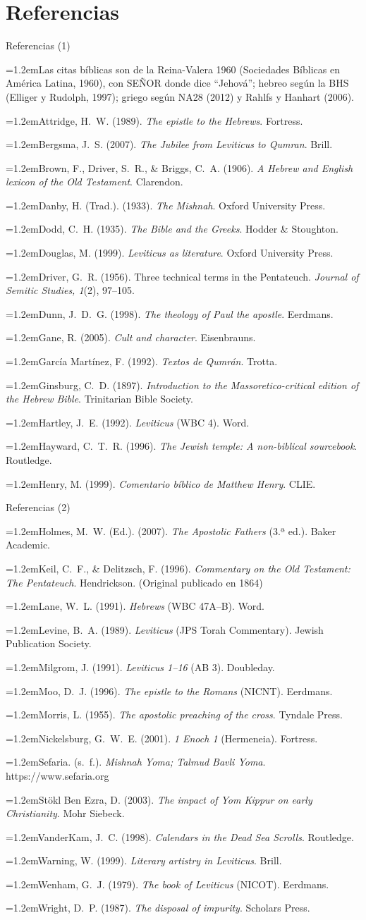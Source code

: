 \documentclass[hyperref={bookmarks=false},aspectratio=169]{beamer}
\newcommand{\SENOR}{S{\fontsize{0.78em}{1em}\selectfont EÑOR}}
\newcommand{\refapa}[1]{\par{\RaggedRight\hangindent=1.2em\hangafter=1\noindent #1\par}\vspace{3pt}}
\begin{document}
\section{Referencias}

\begin{frame}{Referencias (1)}
\tiny
\refapa{Las citas bíblicas son de la Reina-Valera 1960 (Sociedades Bíblicas en América Latina, 1960), con \SENOR{} donde dice ``Jehová''; hebreo según la BHS (Elliger y Rudolph, 1997); griego según NA28 (2012) y Rahlfs y Hanhart (2006).}
\refapa{Attridge, H.~W. (1989). \emph{The epistle to the Hebrews}. Fortress.}
\refapa{Bergsma, J.~S. (2007). \emph{The Jubilee from Leviticus to Qumran}. Brill.}
\refapa{Brown, F., Driver, S.~R., \& Briggs, C.~A. (1906). \emph{A Hebrew and English lexicon of the Old Testament}. Clarendon.}
\refapa{Danby, H. (Trad.). (1933). \emph{The Mishnah}. Oxford University Press.}
\refapa{Dodd, C.~H. (1935). \emph{The Bible and the Greeks}. Hodder \& Stoughton.}
\refapa{Douglas, M. (1999). \emph{Leviticus as literature}. Oxford University Press.}
\refapa{Driver, G.~R. (1956). Three technical terms in the Pentateuch. \emph{Journal of Semitic Studies, 1}(2), 97--105.}
\refapa{Dunn, J.~D.~G. (1998). \emph{The theology of Paul the apostle}. Eerdmans.}
\refapa{Gane, R. (2005). \emph{Cult and character}. Eisenbrauns.}
\refapa{García Martínez, F. (1992). \emph{Textos de Qumrán}. Trotta.}
\refapa{Ginsburg, C.~D. (1897). \emph{Introduction to the Massoretico-critical edition of the Hebrew Bible}. Trinitarian Bible Society.}
\refapa{Hartley, J.~E. (1992). \emph{Leviticus} (WBC 4). Word.}
\refapa{Hayward, C.~T.~R. (1996). \emph{The Jewish temple: A non-biblical sourcebook}. Routledge.}
\refapa{Henry, M. (1999). \emph{Comentario bíblico de Matthew Henry}. CLIE.}
\end{frame}

\begin{frame}{Referencias (2)}
\tiny
\refapa{Holmes, M.~W. (Ed.). (2007). \emph{The Apostolic Fathers} (3.ª ed.). Baker Academic.}
\refapa{Keil, C.~F., \& Delitzsch, F. (1996). \emph{Commentary on the Old Testament: The Pentateuch}. Hendrickson. (Original publicado en 1864)}
\refapa{Lane, W.~L. (1991). \emph{Hebrews} (WBC 47A--B). Word.}
\refapa{Levine, B.~A. (1989). \emph{Leviticus} (JPS Torah Commentary). Jewish Publication Society.}
\refapa{Milgrom, J. (1991). \emph{Leviticus 1--16} (AB 3). Doubleday.}
\refapa{Moo, D.~J. (1996). \emph{The epistle to the Romans} (NICNT). Eerdmans.}
\refapa{Morris, L. (1955). \emph{The apostolic preaching of the cross}. Tyndale Press.}
\refapa{Nickelsburg, G.~W.~E. (2001). \emph{1 Enoch 1} (Hermeneia). Fortress.}
\refapa{Sefaria. (s.~f.). \emph{Mishnah Yoma; Talmud Bavli Yoma}. https://www.sefaria.org}
\refapa{Stökl Ben Ezra, D. (2003). \emph{The impact of Yom Kippur on early Christianity}. Mohr Siebeck.}
\refapa{VanderKam, J.~C. (1998). \emph{Calendars in the Dead Sea Scrolls}. Routledge.}
\refapa{Warning, W. (1999). \emph{Literary artistry in Leviticus}. Brill.}
\refapa{Wenham, G.~J. (1979). \emph{The book of Leviticus} (NICOT). Eerdmans.}
\refapa{Wright, D.~P. (1987). \emph{The disposal of impurity}. Scholars Press.}
\end{frame}
\end{document}
